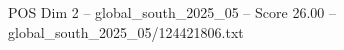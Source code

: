 \begin{textsample}{POS Dim 2 – global\_south\_2025\_05 – Score 26.00 – global\_south\_2025\_05/124421806.txt}
\end{textsample}
